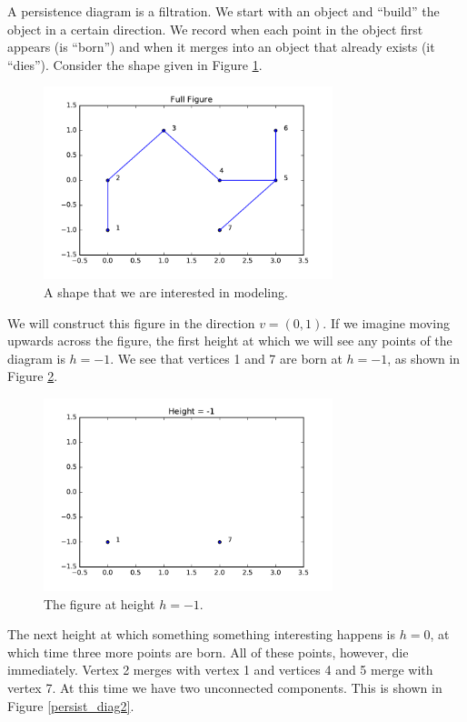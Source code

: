 \documentclass[codesnippet]{jss}
\begin{document}
A persistence diagram is a filtration.  We start with an object and ``build'' the object in a certain direction.  We record when each point in the object first appears (is ``born'') and when it merges into an object that already exists (it ``dies'').  Consider the shape given in Figure \ref{Full_Fig}.
\begin{figure}
\centering
\includegraphics[width = 0.75\textwidth]{../full_fig.pdf}
\caption{\label{Full_Fig} A shape that we are interested in modeling.}
\end{figure}
We will construct this figure in the direction $v = (0,1)$.  If we imagine moving upwards across the figure, the first height at which we will see any points of the diagram is $h=-1$.  We see that vertices 1 and 7 are born at $h = -1$, as shown in Figure \ref{h1}.
\begin{figure}
\centering
\includegraphics[width = 0.75\textwidth]{../h1.pdf}
\caption{\label{h1} The figure at height $h = -1$.}
\end{figure}
The next height at which something something interesting happens is $h = 0$, at which time three more points are born.  All of these points, however, die immediately.  Vertex 2 merges with vertex 1 and vertices 4 and 5 merge with vertex 7.  At this time we have two unconnected components. This is shown in Figure \ref{persist_diag2}.
\end{document}
